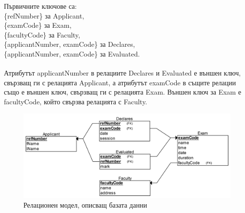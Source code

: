\documentclass[a4paper,12pt]{article}
\begin{document}
Първичните ключове са:\\
 \{refNumber\} за Applicant,\\
\{examCode\} за Exam,\\
\{facultyCode\} за Faculty,\\
\{applicantNumber, examCode\} за Declares, \\
\{applicantNumber, examCode\} за Evaluated. \\
\\

Атрибутът applicantNumber в релациите Declares и Evaluated е външен ключ, свързващ ги с релацията Applicant, а атрибутът examCode в същите релации също е външен ключ, свързващ ги с релацията Exam. Външен ключ за Exam е facultyCode, който свързва релацията с Faculty.\\
\begin{figure}[b!]
\includegraphics[width=1\linewidth]{rel.png}
  \caption{Релационен модел, описващ базата данни}
\end{figure}
\pagebreak
\end{document}
